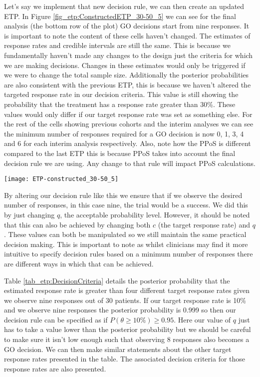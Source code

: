 Let's say we implement that new decision rule, we can then create an updated ETP. In Figure \ref{fig_etp:ConstructedETP_30-50_5} we can see for the final analysis (the bottom row of the plot) GO decisions start from nine responses. It is important to note the content of these cells haven't changed. The estimates of response rates and credible intervals are still the same. This is because we fundamentally haven't made any changes to the design just the criteria for which we are making decisions. Changes in these estimates would only be triggered if we were to change the total sample size. Additionally the posterior probabilities are also consistent with the previous ETP, this is because we haven't altered the targeted response rate in our decision criteria. This value is still showing the probability that the treatment has a response rate greater than 30\%. These values would only differ if our target response rate was set as something else. For the rest of the cells showing previous cohorts and the interim analyses we can see the minimum number of responses required for a GO decision is now 0, 1, 3, 4 and 6 for each interim analysis respectively. Also, note how the PPoS is different compared to the last ETP this is because PPoS takes into account the final decision rule we are using. Any change to that rule will impact PPoS calculations. 

\begin{sidewaysfigure}
	\centering
	\caption{ETP with updated final decision rule.}
	\label{fig_etp:ConstructedETP_30-50_5}
	\texttt{[image: ETP-constructed\_30-50\_5]}
\end{sidewaysfigure}

By altering our decision rule like this we ensure that if we observe the desired number of responses, in this case nine, the trial would be a success. We did this by just changing $q$, the acceptable probability level. However, it should be noted that this can also be achieved by changing both $c$ (the target response rate) and $q$. These values can both be manipulated so we still maintain the same practical decision making. This is important to note as whilst clinicians may find it more intuitive to specify decision rules based on a minimum number of responses there are different ways in which that can be achieved. 

Table \ref{tab_etp:DecisionCriteria} details the posterior probability that the estimated response rate is greater than four different target response rates given we observe nine responses out of 30 patients. If our target response rate is 10\% and we observe nine responses the posterior probability is 0.999 so then our decision rule can be specified as if $P(\theta  \geq 10\%) \geq 0.95$. Here our value of $q$ just has to take a value lower than the posterior probability but we should be careful to make sure it isn't low enough such that observing 8 responses also becomes a GO decision. We can then make similar statements about the other target response rates presented in the table. The associated decision criteria for those response rates are also presented. 

